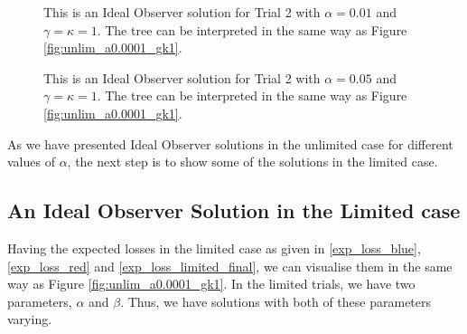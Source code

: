 \begin{figure}
    \centering
    \begin{minipage}{0.45\textwidth}
        \centering
        \scalebox{0.5}{}
        \caption[IO Solution for Trial 2. $\alpha=0.01$,$\gamma=\kappa=1$]{This is an Ideal Observer solution for Trial 2 with $\alpha=0.01$ and $\gamma=\kappa=1$. The tree can be interpreted in the same way as Figure \ref{fig:unlim_a0.0001_gk1}.}
        \label{fig:IO_trial2_a0.01}
    \end{minipage}\hfill
    \begin{minipage}{0.45\textwidth}
        \centering
        \scalebox{0.5}{}
        \caption[IO Solution for Trial 2. $\alpha=0.05$,$\gamma=\kappa=1$]{This is an Ideal Observer solution for Trial 2 with $\alpha=0.05$ and $\gamma=\kappa=1$. The tree can be interpreted in the same way as Figure \ref{fig:unlim_a0.0001_gk1}.}
        \label{fig:IO_trial2_a0.05}
    \end{minipage}
\end{figure}

As we have presented Ideal Observer solutions in the unlimited case for different values of $\alpha$, the next step is to show some of the solutions in the limited case. 

\subsection{An Ideal Observer Solution in the Limited case}
Having the expected losses in the limited case as given in \eqref{exp_loss_blue}, \eqref{exp_loss_red} and \eqref{exp_loss_limited_final}, we can visualise them in the same way as Figure \ref{fig:unlim_a0.0001_gk1}. In the limited trials, we have two parameters, $\alpha$ and $\beta$. Thus, we have solutions with both of these parameters varying. 

